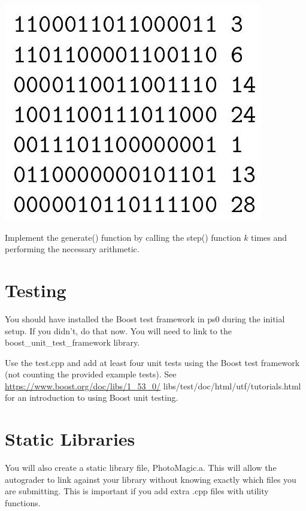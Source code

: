 \documentclass[10pt]{article}
\begin{document}
\begin{center}
\includegraphics[max width=\textwidth]{2024_03_21_ddd7c97e7fb9b272aea0g-3(1)}
\end{center}

Implement the generate() function by calling the step() function $k$ times and performing the necessary arithmetic.

\section*{Testing}
You should have installed the Boost test framework in ps0 during the initial setup. If you didn't, do that now. You will need to link to the boost\_unit\_test\_framework library.

Use the test.cpp and add at least four unit tests using the Boost test framework (not counting the provided example tests). See \href{https://www.boost.org/doc/libs/1_53_0/}{https://www.boost.org/doc/libs/1\_53\_0/} libs/test/doc/html/utf/tutorials.html for an introduction to using Boost unit testing.

\section*{Static Libraries}
You will also create a static library file, PhotoMagic.a. This will allow the autograder to link against your library without knowing exactly which files you are submitting. This is important if you add extra .cpp files with utility functions.
\end{document}
